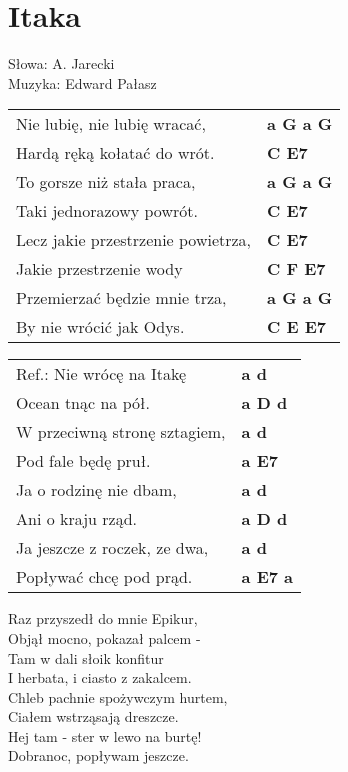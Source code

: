 \section{Itaka}

Słowa: A. Jarecki\\
Muzyka: Edward Pałasz

\vspace{2em}
\begin{tabular}{@{}p{7cm}@{}l@{}}
Nie lubię, nie lubię wracać, & \bfseries  a G a G \\
Hardą ręką kołatać do wrót. & \bfseries  C E7 \\
To gorsze niż stała praca, & \bfseries  a G a G \\
Taki jednorazowy powrót. & \bfseries  C E7 \\
Lecz jakie przestrzenie powietrza, & \bfseries  C E7 \\
Jakie przestrzenie wody & \bfseries C F E7 \\
Przemierzać będzie mnie trza, & \bfseries  a G a G \\
By nie wrócić jak Odys. & \bfseries  C E E7 \\
\end{tabular}

\vspace{1em}
\begin{tabular}{@{}p{7cm}@{}l@{}}
Ref.: Nie wrócę na Itakę & \bfseries  a d \\
Ocean tnąc na pół. & \bfseries  a D d \\
W przeciwną stronę sztagiem, & \bfseries  a d \\
Pod fale będę pruł. & \bfseries  a E7 \\
Ja o rodzinę nie dbam, & \bfseries  a d \\
Ani o kraju rząd. & \bfseries  a D d \\
Ja jeszcze z roczek, ze dwa, & \bfseries  a d \\
Popływać chcę pod prąd. & \bfseries  a E7 a \\
\end{tabular}

\vspace{1em}
Raz przyszedł do mnie Epikur, \\
Objął mocno, pokazał palcem - \\
Tam w dali słoik konfitur \\
I herbata, i ciasto z zakalcem. \\
Chleb pachnie spożywczym hurtem, \\
Ciałem wstrząsają dreszcze. \\
Hej tam - ster w lewo na burtę! \\
Dobranoc, popływam jeszcze. \\

